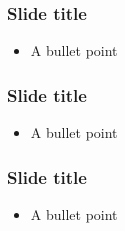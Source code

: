 \begin{frame}
    \frametitle{Slide title}
    \begin{itemize}
        \item A bullet point
    \end{itemize}

\end{frame}



\begin{frame}
    \frametitle{Slide title}
    \begin{itemize}
        \item A bullet point
    \end{itemize}

\end{frame}



\begin{frame}
    \frametitle{Slide title}
    \begin{itemize}
        \item A bullet point
    \end{itemize}

\end{frame}

